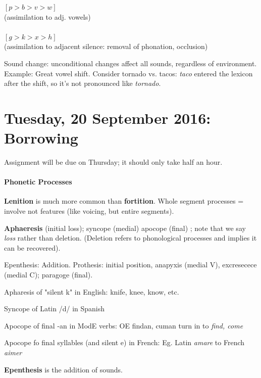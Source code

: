 \documentclass{exam}
\newcommand{\morespace}{\vspace{+2mm}}
\begin{document}
\begin{center}

$[p>b>v>w]$ \\(assimilation to adj. vowels)\\\\\morespace
$[g>k>x>h]$ \\(assimilation to adjacent silence: removal of phonation, occlusion)

\end{center}

Sound change: unconditional changes affect all sounds, regardless of environment. Example: Great vowel shift. Consider tornado vs. tacos: \textit{taco} entered the lexicon after the shift, so it's not pronounced like \textit{tornado}.


\section*{Tuesday, 20 September 2016: Borrowing}

\noindent Assignment will be due on Thursday; it should only take half an hour. \\

\paragraph{Phonetic Processes} \textbf{Lenition} is much more common than \textbf{fortition}. Whole segment processes = involve not features (like voicing, but entire segments). 

\textbf{Aphaeresis} (initial loss); syncope (medial) apocope (final) ; note that we say \textit{loss} rather than deletion. (Deletion refers to phonological processes and implies it can be recovered).

Epenthesis: Addition. Prothesis: initial position, anapyxis (medial V), excresecece (medial C); paragoge (final).

\begin{center}
Apharesis of "silent k" in English: knife, knee, know, etc.

Syncope of Latin /d/ in Spanish

Apocope of final -an in ModE verbs: OE findan, cuman turn in to \textit{find, come}

Apocope fo final syllables (and silent e) in French: Eg. Latin \textit{amare} to French \textit{aimer}

\end{center}
\textbf{Epenthesis} is the addition of sounds.
\end{document}
